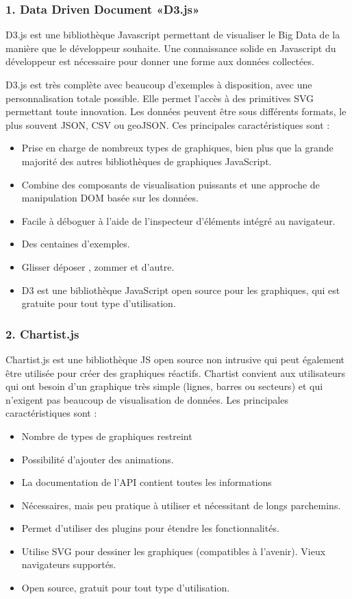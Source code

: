 \documentclass[french, a4paper, 12pt]{report}
\begin{document}
\subsubsection{1. Data Driven Document «D3.js»}
D3.js est une bibliothèque Javascript permettant de visualiser le Big Data de la manière que le développeur souhaite. Une connaissance solide en Javascript du développeur est nécessaire pour donner une forme aux données collectées. 

D3.js est très complète avec beaucoup d’exemples à disposition, avec une personnalisation totale possible. Elle permet l’accès à des primitives SVG permettant toute innovation. Les données peuvent être sous différents formats, le plus souvent JSON,  CSV ou geoJSON. Ces principales caractéristiques sont : 

\begin{itemize}
    \item Prise en charge de nombreux types de graphiques, bien plus que la grande majorité des autres bibliothèques de graphiques JavaScript.
    \item Combine des composants de visualisation puissants et une approche de manipulation DOM basée sur les données.
    \item Facile à déboguer à l'aide de l'inspecteur d'éléments intégré au navigateur.
    \item Des centaines d'exemples.
    \item Glisser déposer , zommer et d'autre.
    \item D3 est une bibliothèque JavaScript open source pour les graphiques, qui est gratuite pour tout type d'utilisation.
    
\end{itemize}
\subsubsection{2. Chartist.js}
Chartist.js est une bibliothèque JS open source non intrusive qui peut également être utilisée pour créer des graphiques réactifs. Chartist convient aux utilisateurs qui ont besoin d’un graphique très simple (lignes, barres ou secteurs) et qui n’exigent pas beaucoup de visualisation de données. Les principales caractéristiques sont :
\begin{itemize}
\item \textbf{} Nombre de types de graphiques restreint
\item \textbf{} Possibilité d’ajouter des animations.
\item \textbf{} La documentation de l’API contient toutes les informations
\item \textbf{}  Nécessaires, mais peu pratique à utiliser et nécessitant de longs parchemins.
\item \textbf{} Permet d'utiliser des plugins pour étendre les fonctionnalités.
\item \textbf{} Utilise SVG pour dessiner les graphiques (compatibles à l’avenir).
Vieux navigateurs supportés.
\item \textbf{} Open source, gratuit pour tout type d’utilisation.
\end{itemize} 
\end{document}
